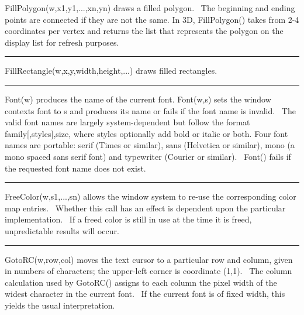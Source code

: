 \noindent
\textsf{FillPolygon(w,x1,y1,...,xn,yn)} draws a filled polygon. \ The
beginning and ending points are connected if they are not the same. In
3D\textsf{, FillPolygon()} takes from 2-4 coordinates per vertex and
returns the list that represents the polygon on the display list for
refresh purposes. 

\bigskip\hrule\vspace{0.1cm}

\noindent
\textsf{FillRectangle(w,x,y,width,height,...)} draws filled rectangles.

\bigskip\hrule\vspace{0.1cm}

\noindent
\textsf{Font(w)} produces the name of the current font.
\textsf{Font(w,s)} sets the window context{\textquotesingle}s font to
\textsf{s} and produces its name or fails if the font name is invalid.
\ The valid font names are largely system-dependent but follow the
format \textsf{family[,styles],size}, where styles optionally add bold
or italic or both. Four font names are portable: \textsf{serif} (Times
or similar), \textsf{sans} (Helvetica or similar), \textsf{mono} (a
mono spaced sans serif font) and \textsf{typewriter} (Courier or
similar). \ \textsf{Font()} fails if the requested font name does not
exist.

\bigskip\hrule\vspace{0.1cm}

\noindent
\textsf{FreeColor(w,s1,...,sn)} allows the window system to re-use the
corresponding color map entries. \ Whether this call has an effect is
dependent upon the particular implementation. \ If a freed color is
still in use at the time it is freed, unpredictable results will occur.

\bigskip\hrule\vspace{0.1cm}

\noindent
\textsf{GotoRC(w,row,col)} moves the text cursor to a particular row and
column, given in numbers of characters; the upper-left corner is
coordinate (1,1). \ The column calculation used by \textsf{GotoRC()}
assigns to each column the pixel width of the widest character in the
current font. \ If the current font is of fixed width, this yields the
usual interpretation.

